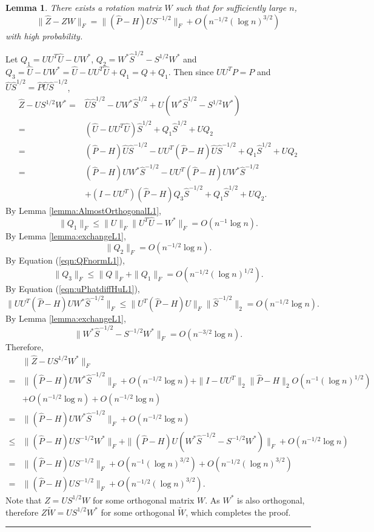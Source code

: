 \documentclass[a4paper]{article}
\newenvironment{proof}{{\bf Proof:  }}{\hfill\rule{2mm}{2mm}}
\newtheorem{lemma}[fact]{Lemma}
\newcommand{\RT}[1]{\marginpar{\footnotesize\color{red}RT: #1}}
\begin{document}
\begin{lemma}
\label{lemma:XhatDiffXWexpressionL1}
There exists a rotation matrix $W$ such that for sufficiently large $n$,
\[
	\|\hat{Z} - Z W\|_F = \| (\hat{P} - H) U S^{-1/2} \|_F + O(n^{-1/2} (\log n)^{3/2})
\]
with high probability.
\end{lemma}
\begin{proof}
Let $Q_1 = U U^T \hat{U} - U W^*$, $Q_2 = W^* \hat{S}^{1/2} - S^{1/2} W^*$ and $Q_3 = \hat{U} - U W^* = \hat{U} - U U^T \hat{U} + Q_1 = Q + Q_1$. Then since $U U^T P = P$ and $\hat{U} \hat{S}^{1/2} = \hat{P} \hat{U} \hat{S}^{-1/2}$,
\begin{align*}
	\hat{Z} - U S^{1/2} W^*
    = & \hat{U} \hat{S}^{1/2} - U W^* \hat{S}^{1/2} + U(W^* \hat{S}^{1/2} - S^{1/2} W^*) \\
    = & (\hat{U} - U U^T \hat{U}) \hat{S}^{1/2} + Q_1 \hat{S}^{1/2} + U Q_2 \\
    = & (\hat{P} - H) \hat{U} \hat{S}^{-1/2} - U U^T(\hat{P} - H)\hat{U}\hat{S}^{-1/2} + Q_1 \hat{S}^{1/2} + U Q_2 \\
    = & (\hat{P} - H) U W^* \hat{S}^{-1/2} - U U^T(\hat{P} - H)U W^*\hat{S}^{-1/2} \\
    & + (I - U U^T)(\hat{P} - H) Q_3 \hat{S}^{-1/2} + Q_1 \hat{S}^{1/2} + U Q_2.
\end{align*}
By Lemma \ref{lemma:AlmostOrthogonalL1},
\[
	\|Q_1\|_F \le \| U\|_F \| U^T \hat{U} - W^* \|_F = O(n^{-1} \log n).
\]
By Lemma \ref{lemma:exchangeL1},
\[
	\|Q_2\|_F = O(n^{-1/2} \log n).
\]
By Equation (\ref{eqn:QFnormL1}),
\[
	\|Q_3\|_F \le \|Q\|_F + \|Q_1\|_F = O(n^{-1/2} (\log n)^{1/2}).
\]
By Equation (\ref{eqn:uPhatdiffHuL1}),
\[
	\| U U^T(\hat{P} - H)U W^*\hat{S}^{-1/2} \|_F
    \le \| U^T(\hat{P} - H)U \|_F \| \hat{S}^{-1/2} \|_2
    = O(n^{-1/2} \log n).
\]
By Lemma \ref{lemma:exchangeL1},
\[
	\| W^* \hat{S}^{-1/2} - S^{-1/2} W^* \|_F = O(n^{-3/2} \log n).
\]
Therefore,
\begin{align*}
	& \| \hat{Z} - U S^{1/2} W^* \|_F \\
    = & \| (\hat{P} - H) U W^* \hat{S}^{-1/2} \|_F + O(n^{-1/2} \log n)
    + \|I - U U^T \|_2 \| \hat{P} - H \|_2 O(n^{-1} (\log n)^{1/2}) \\
    & + O(n^{-1/2} \log n) + O(n^{-1/2} \log n)\\
    = & \| (\hat{P} - H) U W^* \hat{S}^{-1/2} \|_F + O(n^{-1/2} \log n) \\
    \le & \| (\hat{P} - H) U S^{-1/2} W^* \|_F + \|(\hat{P} - H) U (W^* \hat{S}^{-1/2} - S^{-1/2} W^*) \|_F + O(n^{-1/2} \log n) \\
    = & \| (\hat{P} - H) U S^{-1/2}\|_F + O(n^{-1} (\log n)^{3/2}) + O(n^{-1/2} (\log n)^{3/2}) \\
    = & \| (\hat{P} - H) U S^{-1/2}\|_F + O(n^{-1/2} (\log n)^{3/2}).
\end{align*}
\RT{$\|I - U U^T\|_2 = O(1)$}
Note that $Z = U S^{1/2} W$ for some orthogonal matrix $W$. As $W^*$ is also orthogonal, therefore $Z \tilde{W} = U S^{1/2} W^*$ for some orthogonal $\tilde{W}$, which completes the proof.
\end{proof}
\end{document}
